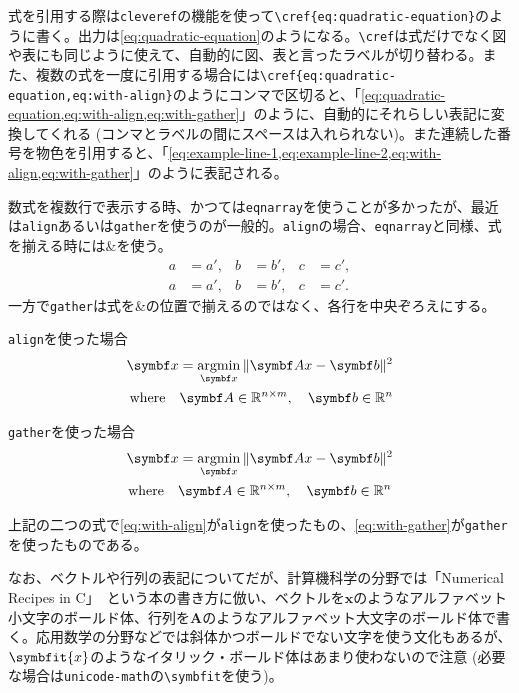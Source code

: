 式を引用する際は\texttt{cleveref}の機能を使って\texttt{\textbackslash cref\{eq:quadratic-equation\}}のように書く。出力は\cref{eq:quadratic-equation}のようになる。\texttt{\textbackslash cref}は式だけでなく図や表にも同じように使えて、自動的に図、表と言ったラベルが切り替わる。また、複数の式を一度に引用する場合には\texttt{\textbackslash cref\{eq:quadratic-equation,eq:with-align\}}のようにコンマで区切ると、「\cref{eq:quadratic-equation,eq:with-align,eq:with-gather}」のように、自動的にそれらしい表記に変換してくれる (コンマとラベルの間にスペースは入れられない)。また連続した番号を物色を引用すると、「\cref{eq:example-line-1,eq:example-line-2,eq:with-align,eq:with-gather}」のように表記される。

数式を複数行で表示する時、かつては\texttt{eqnarray}を使うことが多かったが、最近は\texttt{align}あるいは\texttt{gather}を使うのが一般的。\texttt{align}の場合、\texttt{eqnarray}と同様、式を揃える時には\&を使う。
%
\begin{align}
  a &= a', & b &= b', & c &= c', \label{eq:example-line-1} \\
  a &= a', & b &= b', & c &= c'. \label{eq:example-line-2}
\end{align}
%
一方で\texttt{gather}は式を\&の位置で揃えるのではなく、各行を中央ぞろえにする。
%
\begin{titlebox}{\texttt{align}を使った場合}
  \adjustdisplayskips{1mm}
  \begin{align}
    \mathbf{x} = \argmin_{\mathbf{x}} \| \mathbf{Ax} - \mathbf{b} \|^2 \nonumber \\
    \mbox{where} \quad \mathbf{A} \in \mathbb{R}^{n \times m}, \quad \mathbf{b} \in \mathbb{R}^n \label{eq:with-align}
  \end{align}
\end{titlebox}
%
\begin{titlebox}{\texttt{gather}を使った場合}
  \adjustdisplayskips{1mm}
  \begin{gather}
    \mathbf{x} = \argmin_{\mathbf{x}} \| \mathbf{Ax} - \mathbf{b} \|^2 \nonumber \\
    \mbox{where} \quad \mathbf{A} \in \mathbb{R}^{n \times m}, \quad \mathbf{b} \in \mathbb{R}^n \label{eq:with-gather}
  \end{gather}
\end{titlebox}
%
上記の二つの式で\cref{eq:with-align}が\texttt{align}を使ったもの、\cref{eq:with-gather}が\texttt{gather}を使ったものである。

なお、ベクトルや行列の表記についてだが、計算機科学の分野では「Numerical Recipes in C」~\cite{numrecipes}という本の書き方に倣い、ベクトルを$\mathbf{x}$のようなアルファベット小文字のボールド体、行列を$\mathbf{A}$のようなアルファベット大文字のボールド体で書く。応用数学の分野などでは斜体かつボールドでない文字を使う文化もあるが、$\symbfit{x}$のようなイタリック・ボールド体はあまり使わないので注意 (必要な場合は\texttt{unicode-math}の\texttt{\textbackslash symbfit}を使う)。


